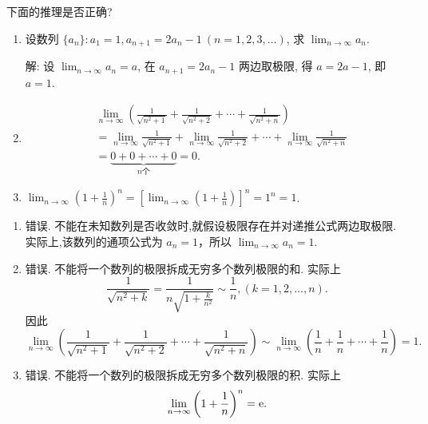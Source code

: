 \begin{exercise}[1.2.12]
    下面的推理是否正确?
    \begin{enumerate}
        \item 设数列 $\{a_n\}: a_1 = 1, a_{n+1} = 2a_n - 1 \ (n=1, 2, 3, \ldots)$, 求 $\lim_{n\to\infty} a_n$.
            \par\noindent 解: 设 $\lim_{n\to\infty} a_n = a$, 在 $a_{n+1} = 2a_n - 1$ 两边取极限, 得 $a = 2a - 1$, 即 $a = 1$.

        \item
            \begin{align*}
                &\lim_{n\to\infty} \left( \frac{1}{\sqrt{n^2+1}} + \frac{1}{\sqrt{n^2+2}} + \cdots + \frac{1}{\sqrt{n^2+n}} \right) \\
                &= \lim_{n\to\infty} \frac{1}{\sqrt{n^2+1}} + \lim_{n\to\infty} \frac{1}{\sqrt{n^2+2}} + \cdots + \lim_{n\to\infty} \frac{1}{\sqrt{n^2+n}} \\
                &= \underbrace{0 + 0 + \cdots + 0}_{\text{$n$个}} = 0.
            \end{align*}

        \item $\lim_{n\to\infty} \left(1 + \frac{1}{n}\right)^n = \left[\lim_{n\to\infty} \left(1 + \frac{1}{n}\right)\right]^n = 1^n = 1$.
    \end{enumerate}
\end{exercise}

\begin{solution}
    \begin{enumerate}
        \item 错误. 不能在未知数列是否收敛时,就假设极限存在并对递推公式两边取极限. 实际上,该数列的通项公式为 $a_n = 1$，所以 $\lim_{n\to\infty} a_n = 1$.
        \item 错误. 不能将一个数列的极限拆成无穷多个数列极限的和. 实际上
              $$
                  \frac{1}{\sqrt{n^2+k}} = \frac{1}{n\sqrt{1+\frac{k}{n^2}}} \sim \frac{1}{n}, (k=1,2,\ldots,n).
              $$
              因此
              $$
                  \lim_{n\to\infty} \left( \frac{1}{\sqrt{n^2+1}} + \frac{1}{\sqrt{n^2+2}} + \cdots + \frac{1}{\sqrt{n^2+n}} \right) \sim \lim_{n\to\infty} \left( \frac{1}{n} + \frac{1}{n} + \cdots + \frac{1}{n} \right) = 1.
              $$
        \item 错误. 不能将一个数列的极限拆成无穷多个数列极限的积. 实际上
              $$
                  \lim_{n\to\infty} \left(1 + \frac{1}{n}\right)^n = \mathrm{e}.
              $$
    \end{enumerate}
\end{solution}

